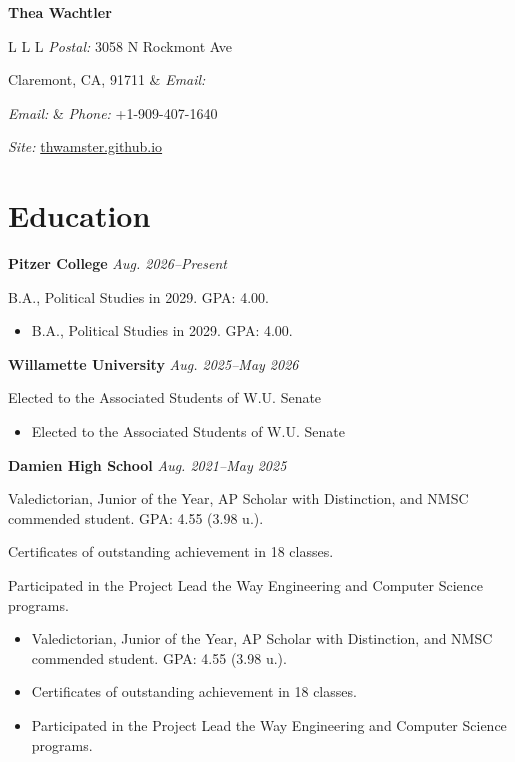 \documentclass[11pt, a4paper]{moderncv}
\newcommand{\firstcolumn}{0.50}
\newcommand{\spacing}{\vspace{3pt}}
\newcommand{\subspacing}{\vspace{1pt}}
\renewcommand{\titlefont}{\huge \bfseries \rmfamily \color{color1}}
\newcommand*{\entry}[3]{
    \textbf{#1} \subsectionrule \textit{#2}
    \ifx
        \relax#3\relax
        \par
    \else
        \begin{itemize}
        #3
        \end{itemize}
    \fi
    \subspacing
}
\begin{document}
    {\titlefont Thea Wachtler} \sectionrule
    \par \spacing
    \begin{tabularx}{\textwidth}{L L L}
		\textit{Postal:} 3058 N Rockmont Ave \par
         Claremont, CA, 91711 &
        \textit{Email:}  \par
        \textit{Email:}  &
        \textit{Phone:} +1-909-407-1640 \par
        \textit{Site:} \href{https://thwamster.github.io/}{thwamster.github.io} \\
    \end{tabularx}

    \spacing

    \begin{minipage}[t]{\firstcolumn \textwidth}

        \section{Education} \label{sec:education}
        \entry{Pitzer College}{Aug. 2026--Present}{
            \item B.A., Political Studies in 2029. GPA: 4.00.
        }
        \entry{Willamette University}{Aug. 2025--May 2026}{
            \item Elected to the Associated Students of W.U. Senate
        }
        \entry{Damien High School}{Aug. 2021--May 2025}{
            \item Valedictorian, Junior of the Year, AP Scholar with Distinction, and NMSC commended student. GPA: 4.55 (3.98 u.).
            \item Certificates of outstanding achievement in 18 classes.
            \item Participated in the Project Lead the Way Engineering and Computer Science programs.
        }



\end{minipage}
\end{document}
